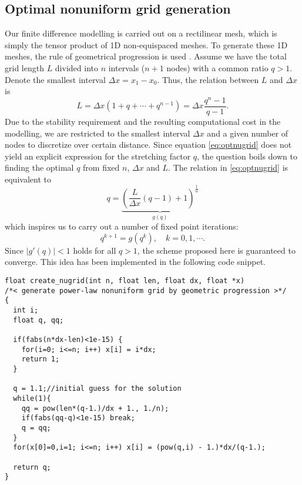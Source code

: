 \documentclass[a4paper,10pt]{article}
\begin{document}
\subsection{Optimal nonuniform grid generation}

Our finite difference modelling is carried out on a rectilinear mesh, which is simply the tensor product of 1D non-equispaced meshes. To generate these 1D meshes, the rule of geometrical progression is used \citep[Appendix C]{mulder2006multigrid}. 
Assume we have the total grid length $L$ divided into $n$ intervals ($n+1$ nodes) with a common ratio $q>1$. Denote the smallest interval $\Delta x=x_1-x_0$. Thus, the relation between $L$ and $\Delta x$ is
\begin{equation}\label{eq:optnugrid}
  L = \Delta x(1 + q + \cdots + q^{n-1})= \Delta x \frac{q^n-1}{q-1}.
\end{equation}
Due to the stability requirement and the resulting computational cost in the modelling, we are restricted to the smallest interval $\Delta x$ and a given number of nodes to discretize over certain distance. Since equation \eqref{eq:optnugrid} does not yield an explicit expression for the stretching factor $q$, the question boils down to finding the optimal $q$ from fixed  $n$, $\Delta x$ and $L$.
The relation in \eqref{eq:optnugrid} is equivalent to 
\begin{equation}\label{eq:rr}
q= \underbrace{\left(\frac{L}{\Delta x}(q-1) +1\right)^{\frac{1}{n}}}_{g(q)}
\end{equation}
which inspires us to carry out a number of fixed point iterations:
\begin{equation}\label{eq:fixed}
q^{k+1} = g(q^k), \quad k=0,1,\cdots.
\end{equation}
Since $|g'(q)|<1$ holds for all $q>1$, the scheme proposed here is guaranteed to converge. This idea has been implemented in the following code snippet.
\begin{verbatim}
float create_nugrid(int n, float len, float dx, float *x)
/*< generate power-law nonuniform grid by geometric progression >*/
{
  int i;
  float q, qq;

  if(fabs(n*dx-len)<1e-15) {
    for(i=0; i<=n; i++) x[i] = i*dx;
    return 1;
  }
  
  q = 1.1;//initial guess for the solution
  while(1){
    qq = pow(len*(q-1.)/dx + 1., 1./n);
    if(fabs(qq-q)<1e-15) break;
    q = qq;
  }
  for(x[0]=0,i=1; i<=n; i++) x[i] = (pow(q,i) - 1.)*dx/(q-1.);

  return q;
}
\end{verbatim}
\end{document}
